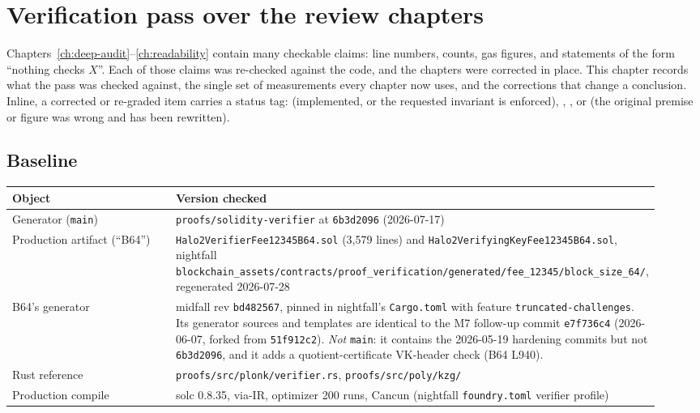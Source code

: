 \chapter{Verification pass over the review chapters}
\label{ch:verification-pass}

Chapters~\ref{ch:deep-audit}--\ref{ch:readability} contain many
checkable claims: line numbers, counts, gas figures, and statements of the
form ``nothing checks $X$''. Each of those claims was re-checked against the
code, and the chapters were corrected in place. This chapter records what the
pass was checked against, the single set of measurements every chapter now
uses, and the corrections that change a conclusion. Inline, a corrected or
re-graded item carries a status tag:  (implemented, or
the requested invariant is enforced), , , or
 (the original premise or figure was wrong and has been
rewritten).

\section{Baseline}
\label{sec:verification-pass}

\begin{center}\small
\begin{tabular}{@{}p{0.27\linewidth}p{0.66\linewidth}@{}}
\toprule
\textbf{Object} & \textbf{Version checked} \\
\midrule
Generator (\texttt{main}) & \texttt{proofs/\allowbreak{}solidity-verifier} at
  \texttt{6b3d2096} (2026-07-17) \\
Production artifact (``B64'') &
  \texttt{Halo2VerifierFee12345B64.sol} (3{,}579 lines) and
  \texttt{Halo2VerifyingKeyFee12345B64.sol}, nightfall
  \texttt{blockchain\_\allowbreak{}assets/\allowbreak{}contracts/\allowbreak{}proof\_\allowbreak{}verification/\allowbreak{}generated/\allowbreak{}fee\_\allowbreak{}12345/\allowbreak{}block\_\allowbreak{}size\_\allowbreak{}64/\allowbreak{}},
  regenerated 2026-07-28 \\
B64's generator & midfall rev \texttt{bd482567}, pinned in nightfall's
  \texttt{Cargo.toml} with feature \texttt{truncated-challenges}. Its
  generator sources and templates are identical to the M7 follow-up commit
  \texttt{e7f736c4} (2026-06-07, forked from \texttt{51f912c2}).
  \emph{Not} \texttt{main}: it contains the 2026-05-19 hardening commits
  but not \texttt{6b3d2096}, and it adds a quotient-certificate VK-header
  check (B64 L940). \\
Rust reference & \texttt{proofs/\allowbreak{}src/\allowbreak{}plonk/\allowbreak{}verifier.rs},
  \texttt{proofs/\allowbreak{}src/\allowbreak{}poly/\allowbreak{}kzg/\allowbreak{}} \\
Production compile & solc 0.8.35, via-IR, optimizer 200 runs, Cancun
  (nightfall \texttt{foundry.toml} verifier profile) \\
\bottomrule
\end{tabular}
\end{center}

